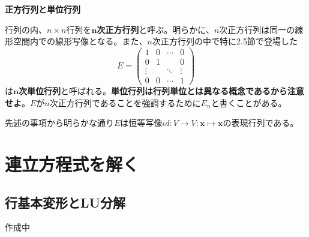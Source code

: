 \documentclass[dvipdfmx]{jsarticle}
\begin{document}
\textbf{正方行列と単位行列}\par
行列の内、$n \times n$行列を$\bm{n}$\textbf{次正方行列}と呼ぶ。明らかに、$n$次正方行列は同一の線形空間内での線形写像となる。また、$n$次正方行列の中で特に2.5節で登場した
\[E=\begin{pmatrix}1&0&\cdots&0\\0&1&{}&0\\\vdots&{}&\ddots&\vdots\\0&0&\cdots&1\end{pmatrix}\]
は$\bm{n}$\textbf{次単位行列}と呼ばれる。\textbf{単位行列は行列単位とは異なる概念であるから注意せよ}。$E$が$n$次正方行列であることを強調するために$E_n$と書くことがある。\par
先述の事項から明らかな通り$E$は恒等写像$id:V \to V:\bm{x}\mapsto\bm{x}$の表現行列である。

\section{連立方程式を解く}

\subsection{行基本変形とLU分解}
作成中
\end{document}
